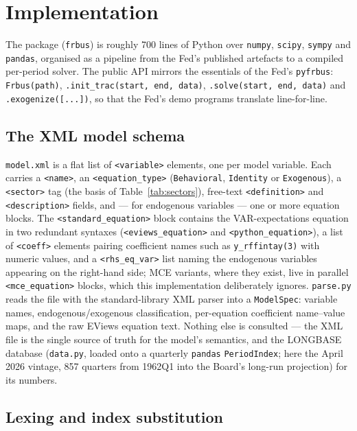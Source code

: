 \section{Implementation}
\label{sec:implementation}

The package (\texttt{frbus}) is roughly 700 lines of Python over \texttt{numpy}, \texttt{scipy}, \texttt{sympy} and \texttt{pandas}, organised as a pipeline from the Fed's published artefacts to a compiled per-period solver. The public API mirrors the essentials of the Fed's \texttt{pyfrbus}: \texttt{Frbus(path)}, \texttt{.init\_trac(start, end, data)}, \texttt{.solve(start, end, data)} and \texttt{.exogenize([...])}, so that the Fed's demo programs translate line-for-line.

\subsection{The XML model schema}
\label{sec:xml}

\texttt{model.xml} is a flat list of \texttt{<variable>} elements, one per model variable. Each carries a \texttt{<name>}, an \texttt{<equation\_type>} (\texttt{Behavioral}, \texttt{Identity} or \texttt{Exogenous}), a \texttt{<sector>} tag (the basis of Table~\ref{tab:sectors}), free-text \texttt{<definition>} and \texttt{<description>} fields, and --- for endogenous variables --- one or more equation blocks. The \texttt{<standard\_equation>} block contains the VAR-expectations equation in two redundant syntaxes (\texttt{<eviews\_equation>} and \texttt{<python\_equation>}), a list of \texttt{<coeff>} elements pairing coefficient names such as \texttt{y\_rffintay(3)} with numeric values, and a \texttt{<rhs\_eq\_var>} list naming the endogenous variables appearing on the right-hand side; MCE variants, where they exist, live in parallel \texttt{<mce\_equation>} blocks, which this implementation deliberately ignores. \texttt{parse.py} reads the file with the standard-library XML parser into a \texttt{ModelSpec}: variable names, endogenous/exogenous classification, per-equation coefficient name--value maps, and the raw EViews equation text. Nothing else is consulted --- the XML file is the single source of truth for the model's semantics, and the LONGBASE database (\texttt{data.py}, loaded onto a quarterly \texttt{pandas} \texttt{PeriodIndex}; here the April 2026 vintage, 857 quarters from 1962Q1 into the Board's long-run projection) for its numbers.

\subsection{Lexing and index substitution}
\label{sec:lexing}

